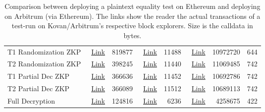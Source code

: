 \begin{table}[t]
\begin{tabular}{|l|r|r|r|r|r|r|r|}
		T1 Randomization ZKP &~\href{https://kovan.etherscan.io/tx/0x30e8ccff5af6f3489ba2dc11e3198f0216487f380aa2a66ddf97e94650490e88}{Link} &819877 &  ~\href{https://kovan.etherscan.io/tx/0xc08cc82908b7e87e8ddc75695c4f29c3bce3d9a8caced144f003c59e23f4690e}{Link}&  11488&  ~\href{https://explorer.offchainlabs.com/#/tx/0xe3d1ba8bc653397dd67f3bfb602db0acce617668dc2ae2f30e038b4137a60e24}{Link}& 10972720& 644\\  \cline{1-8}
		
		T2 Randomization ZKP & ~\href{https://kovan.etherscan.io/tx/0x6dd05a76c771089144583a685c2fb9a6b566a626aa86b568230faf83268fdd92}{Link}& 398245 & ~\href{https://kovan.etherscan.io/tx/0xd790b2edd8800a183068b3253d7e5b00e57d850bce8d9b8572494539b58c7e3c}{Link} &11440& ~\href{https://explorer.offchainlabs.com/#/tx/0x71535a6b6d0124cbd61a4993e5e831cc4ba151eec60b1c368a79686f3f5bc1f4}{Link} & 11069485 & 742 \\  \cline{1-8}
		
		T1 Partial Dec ZKP &~\href{https://kovan.etherscan.io/tx/0x477b3e6b645cc672bbbe99ea3e7fa227962a3e1222071c266442a5ab8366e1bb}{Link} &366636 & ~\href{https://kovan.etherscan.io/tx/0xdd0ffc715dc5733bee36fd99d51898cf978de27ece76777099c4570929039a25}{Link} & 11452& ~\href{https://explorer.offchainlabs.com/#/tx/0x9f7fba14177790f6dad6ad9bb0ec3017803b466a27182768b11163162a3961c3}{Link} & 10692786& 742\\  \cline{1-8}
		
		T2 Partial Dec ZKP &~\href{https://kovan.etherscan.io/tx/0x59a6282197cbd71b2c25cd5f3547b41ca7baf33322088f35273c97fce5cf8b56}{Link} &366089 & ~\href{https://kovan.etherscan.io/tx/0xb2a71505f192dd2119634ddd69070c52eb3a3d993aeb632ea8f823eb62f26e84}{Link} & 11512&  ~\href{https://explorer.offchainlabs.com/#/tx/0x724578f12940ebd653613c5037576540ce129ef277e4db67aff135711327e8f8}{Link} & 10689113& 742\\  \cline{1-8}
		
		Full Decryption & ~\href{https://kovan.etherscan.io/tx/0x172804db2abcef274dedfad8f31f84a0bb26c87826842589537f1d511402b282}{Link} & 124816 &  ~\href{https://kovan.etherscan.io/tx/0x10788165eacbbe25066c163fa0cf7a5af07da32c05af001d0f05ad8946974c6e}{Link}& 6236& ~\href{https://explorer.offchainlabs.com/#/tx/0x3515cc045805f2f9af9f378f4725ab4845679ca15ecd2e86758f8d53eb9a7353}{Link} & 4258675 & 422\\  \hline
	\end{tabular}
	\caption{Comparison between deploying a plaintext equality test on Ethereum and deploying on Arbitrum (via Ethereum). The links show the reader the actual transactions of a test-run on Kovan/Arbitrum's respective block explorers. Size is the calldata in bytes.} 
	\label{tab:arbgas}
\end{table}